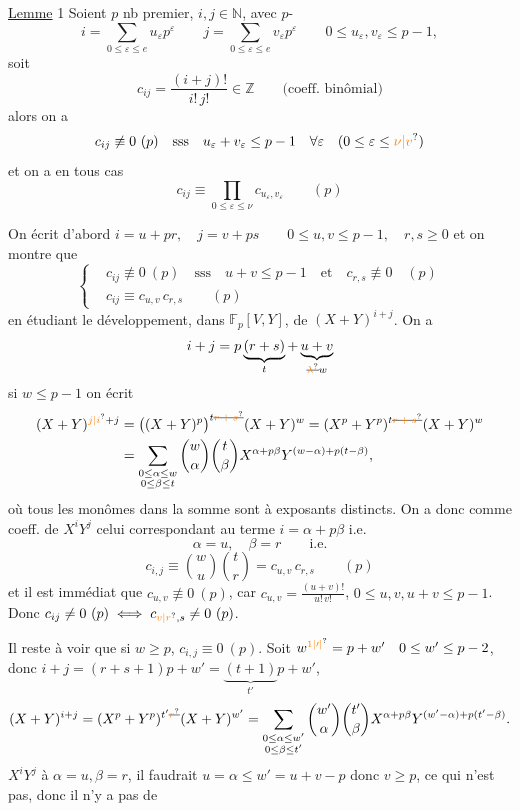 \hfill{}

\uline{Lemme} 1 Soient $p$ nb premier, $i,j\in\mathbb{N}$, avec  $p$-
\[
i=\sum_{0\leq\varepsilon\leq{e}}u_\varepsilon p^\varepsilon
\qquad j=\sum_{0\leq\varepsilon\leq e}v_\varepsilon p^\varepsilon
\qquad 0\leq u_\varepsilon,v_\varepsilon\leq p-1,
\]
soit
\[
c_{ij}=\frac{(i+j)!}{i!\,j!}\in\mathbb{Z}\qquad\text{(coeff. binômial)}
\]
alors on a
\[
c_{ij}\not\equiv0\ (p)\quad\text{sss}\quad u_\varepsilon+v_\varepsilon\leq p-1\quad\forall\varepsilon\quad(0\leq\varepsilon\leq\unsure{\nu|v})
\]
et  on a en tous cas
\[
c_{ij}\equiv\prod_{0\leq\varepsilon\leq\nu}c_{u_\varepsilon,v_\varepsilon}\qquad(p)
\]

On écrit d'abord $i=u+pr,\quad j=v+ps\qquad 0\leq u,v\leq p-1,\quad r,s\geq0$ et on montre que
\[
\left\{\begin{aligned}
&c_{ij}\not\equiv0\ (p)\quad\text{sss}\quad u+v\leq p-1\quad\text{et}\quad c_{r,s}\not\equiv0\quad(p)\\
&c_{ij}\equiv c_{u,v}\,c_{r,s}\qquad(p)
\end{aligned}\right.\tag*{$(*)$}
\]
en étudiant le développement, dans $\mathbb{F}_p[V,Y]$, de $(X+Y)^{i+j}$. On a
\[
i+j=p\underbrace{(r+s)}_{t}+\underbrace{u+v}_{\deleted{\unsure{\lambda}}w}
\]
si $w\leq p-1$ on écrit
\[
\begin{aligned}
(X+Y)^{\unsure{j|i}+j}&=\bigl((X+Y)^p\bigr)^{t\deleted{\unsure{r+s}}}(X+Y)^{w}=(X^p+Y^p)^{t\deleted{\unsure{r+s}}}(X+Y)^w\\
&=\sum_{\substack{0\leq\alpha\leq w\\0\leq\beta\leq t}}\binom{w}{\alpha}\binom{t}{\beta}X^{\alpha+p\beta}Y^{(w-\alpha)+p(t-\beta)},
\end{aligned}
\]
où tous les monômes  dans la somme sont à exposants distincts. On a donc comme coeff. de $X^iY^j$ celui correspondant au terme $i=\alpha+p\beta$ i.e.
\[
\alpha=u,\quad\beta=r\qquad\text{i.e.}
\]
\[
c_{i,j}\equiv\binom{w}{u}\binom{t}{r}=c_{u,v}\,c_{r,s}\qquad(p)
\]
et il est immédiat que $c_{u,v}\not\equiv0\ (p)$, car $c_{u,v}=\frac{(u+v)!}{u!\,v!}$, $0\leq u,v,u+v\leq p-1$. Donc $c_{ij}\neq0\ (p)\iff c_{\unsure{v|r},s}\neq0\ (p)$.

Il reste à voir que si $w\geq p$,   $c_{i,j}\equiv0\ (p)$. Soit $w^{\unsure{1|\prime|{}}}=p+w'\quad 0\leq w'\leq p-2$, donc $i+j=(r+s+1)p+w'=\underbrace{(t+1)}_{t'}p+w'$,
\[
(X+Y)^{i+j}=(X^p+Y^p)^{t'\deleted{\unsure{r}}}(X+Y)^{w'}=\sum_{\substack{0\leq\alpha\leq w'\\0\leq\beta\leq t'}}\binom{w'}{\alpha}\binom{t'}{\beta}X^{\alpha+p\beta}Y^{(w'-\alpha)+p(t'-\beta)}.
\]
 $X^iY^j$  à $\alpha=u,\beta=r$, il faudrait $u=\alpha\leq w'=u+v-p$ donc $v\geq p$, ce qui n'est pas, donc il n'y a pas de

